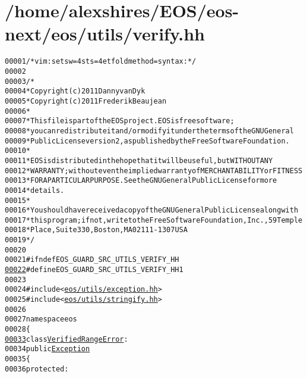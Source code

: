 \hypertarget{verify_8hh_source}{
\section{/home/alexshires/EOS/eos-\/next/eos/utils/verify.hh}
}


\begin{footnotesize}\begin{alltt}
00001 \textcolor{comment}{/* vim: set sw=4 sts=4 et foldmethod=syntax : */}
00002 
00003 \textcolor{comment}{/*}
00004 \textcolor{comment}{ * Copyright (c) 2011 Danny van Dyk}
00005 \textcolor{comment}{ * Copyright (c) 2011 Frederik Beaujean}
00006 \textcolor{comment}{ *}
00007 \textcolor{comment}{ * This file is part of the EOS project. EOS is free software;}
00008 \textcolor{comment}{ * you can redistribute it and/or modify it under the terms of the GNU General}
00009 \textcolor{comment}{ * Public License version 2, as published by the Free Software Foundation.}
00010 \textcolor{comment}{ *}
00011 \textcolor{comment}{ * EOS is distributed in the hope that it will be useful, but WITHOUT ANY}
00012 \textcolor{comment}{ * WARRANTY; without even the implied warranty of MERCHANTABILITY or FITNESS}
00013 \textcolor{comment}{ * FOR A PARTICULAR PURPOSE.  See the GNU General Public License for more}
00014 \textcolor{comment}{ * details.}
00015 \textcolor{comment}{ *}
00016 \textcolor{comment}{ * You should have received a copy of the GNU General Public License along with}
00017 \textcolor{comment}{ * this program; if not, write to the Free Software Foundation, Inc., 59 Temple}
00018 \textcolor{comment}{ * Place, Suite 330, Boston, MA  02111-1307  USA}
00019 \textcolor{comment}{ */}
00020 
00021 \textcolor{preprocessor}{#ifndef EOS\_GUARD\_SRC\_UTILS\_VERIFY\_HH}
\hypertarget{verify_8hh_source_l00022}{}\hyperlink{verify_8hh_a6d5e2ccc170a563905e127e441a01013}{00022} \textcolor{preprocessor}{}\textcolor{preprocessor}{#define EOS\_GUARD\_SRC\_UTILS\_VERIFY\_HH 1}
00023 \textcolor{preprocessor}{}
00024 \textcolor{preprocessor}{#include <\hyperlink{exception_8hh}{eos/utils/exception.hh}>}
00025 \textcolor{preprocessor}{#include <\hyperlink{stringify_8hh}{eos/utils/stringify.hh}>}
00026 
00027 \textcolor{keyword}{namespace }eos
00028 \{
\hypertarget{verify_8hh_source_l00033}{}\hyperlink{classeos_1_1VerifiedRangeError}{00033}     \textcolor{keyword}{class }\hyperlink{classeos_1_1VerifiedRangeError}{VerifiedRangeError} :
00034         \textcolor{keyword}{public} \hyperlink{classeos_1_1Exception}{Exception}
00035     \{
00036         \textcolor{keyword}{protected}:

\end{alltt}
\end{footnotesize}
